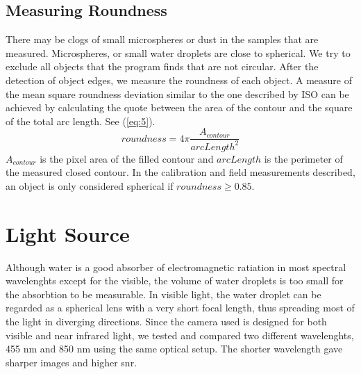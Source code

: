 \subsection{Measuring Roundness}
\label{met:roundness}
There may be clogs of small microspheres or dust in the samples that are measured. Microspheres, or small water droplets are close to spherical. We try to exclude all objects that the program finds that are not circular. After the detection of object edges, we measure the roundness of each object. A measure of the mean square roundness deviation similar to the one described by ISO \cite{iso12181} can be achieved by calculating the quote between the area of the contour and the square of the total arc length. See (\ref{eq:5}).
\begin{equation}
roundness = 4\pi \frac{A_{contour}}{arcLength^2}
\label{eq:5}
\end{equation}
$A_{contour}$ is the pixel area of the filled contour and $arcLength$ is the perimeter of the measured closed contour. In the calibration and field measurements described, an object is only considered spherical if $roundness \geq 0.85$.

\section{Light Source}

Although water is a good absorber of electromagnetic ratiation in most spectral wavelenghts except for the visible, the volume of water droplets is too small for the absorbtion to be measurable. In visible light, the water droplet can be regarded as a spherical lens with a very short focal length, thus spreading most of the light in diverging directions. Since the camera used is designed for both visible and near infrared light, we tested and compared two different wavelenghts, 455 nm and 850 nm using the same optical setup. The shorter wavelength gave sharper images and higher \gls{snr}.

